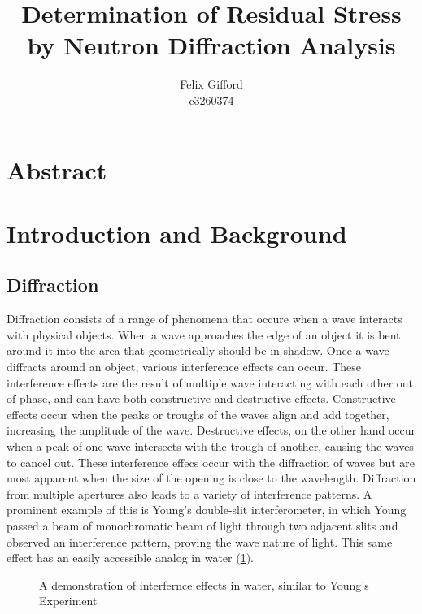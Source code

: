 \documentclass[11pt, oneside]{article}   	%
\title{Determination of Residual Stress by Neutron Diffraction Analysis}
\author{Felix Gifford\\c3260374}
\begin{document}
\maketitle
\section{Abstract}
\section{Introduction and Background}
\subsection{Diffraction}
Diffraction consists of a range of phenomena that occure when a wave interacts with physical objects. When a wave approaches the edge of an object it is bent around it into the area that geometrically should be in shadow. Once a wave diffracts around an object, various interference effects can occur. These interference effects are the result of multiple wave interacting with each other out of phase, and can have both constructive and destructive effects. Constructive effects occur when the peaks or troughs of the waves align and add together, increasing the amplitude of the wave. Destructive effects, on the other hand occur when a peak of one wave intersects with the trough of another, causing the waves to cancel out. These interference effecs occur with the diffraction of waves but are most apparent when the size of the opening is close to the wavelength. Diffraction from multiple apertures also leads to a variety of interference patterns. A prominent example of this is Young's double-slit interferometer, in which Young passed a beam of monochromatic beam of light through two adjacent slits and observed an interference pattern, proving the wave nature of light. This same effect has an easily accessible analog in water (\ref{fig:WaterDiff}).
\begin{figure}
	\caption{A demonstration of interfernce effects in water, similar to Young's Experiment}\label{fig:WaterDiff}
\end{figure}
\end{document}
